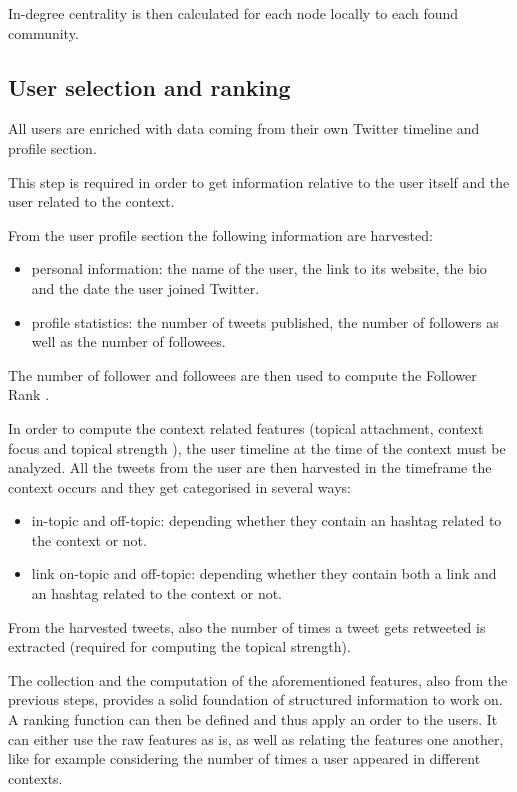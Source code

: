 \documentclass[runningheads]{llncs}
\begin{document}
In-degree centrality is then calculated for each node locally to each found community.

\subsection{User selection and ranking}  \label{sec:ranking}
All users are enriched with data coming from their own Twitter timeline and profile section.

This step is required in order to get information relative to the user itself and the user related to the context.

From the user profile section the following information are harvested:
\begin{itemize}
    \item personal information: the name of the user, the link to its website, the bio and the date the user joined Twitter.
    \item profile statistics: the number of tweets published, the number of followers as well as the number of followees.
\end{itemize}

The number of follower and followees are then used to compute the Follower Rank .

In order to compute the context related features (topical attachment, context focus and topical strength ), the user timeline at the time of the context must be analyzed.
All the tweets from the user are then harvested in the timeframe the context occurs and they get categorised in several ways:
\begin{itemize}
    \item in-topic and off-topic: depending whether they contain an hashtag related to the context or not.
    \item link on-topic and off-topic: depending whether they contain both a link and an hashtag related to the context or not.
\end{itemize}
From the harvested tweets, also the number of times a tweet gets retweeted is extracted (required for computing the topical strength).

The collection and the computation of the aforementioned features, also from the previous steps, provides a solid foundation of structured information to work on.
A ranking function can then be defined and thus apply an order to the users. It can either use the raw features as is, as well as relating the features one another, like for example considering the number of times a user appeared in different contexts.
\end{document}
